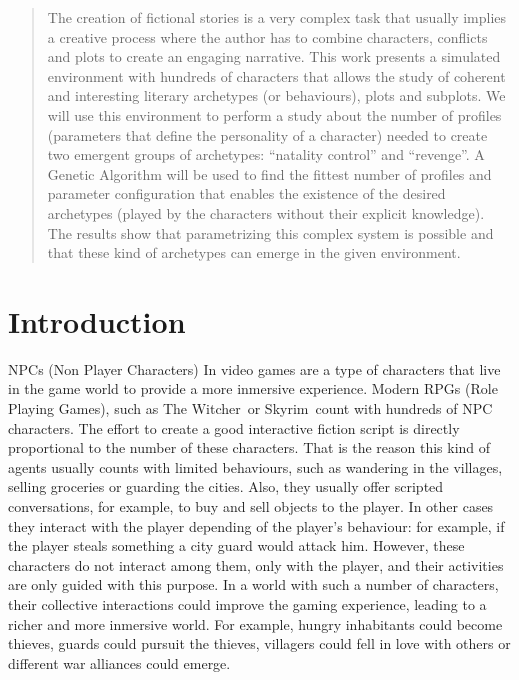 \documentclass[runningheads]{llncs}
\begin{document}
\begin{abstract}


The creation of fictional stories is a very complex task that usually
implies a creative process where the author has to combine characters,
conflicts and plots to create an engaging narrative. This work
presents a simulated environment with hundreds of characters that
allows the study of coherent and interesting literary archetypes (or
behaviours), plots and subplots. We will use this environment to
perform a study about the number of profiles (parameters that define
the personality of a character) needed to create two emergent groups
of archetypes: ``natality control'' and ``revenge''. A Genetic Algorithm
will be used to find the fittest number of profiles and parameter
configuration that enables the existence of the desired archetypes
(played by the characters without their explicit knowledge). The
results show that parametrizing this complex system is possible and
that these kind of archetypes can emerge in the given environment. 

\end{abstract}




\section{Introduction}
\noindent 

NPCs (Non Player Characters) In video games are a type of characters that live in the game world to provide a more inmersive experience. Modern RPGs (Role Playing Games), such as The Witcher~\texttrademark or Skyrim~\texttrademark count with hundreds of NPC characters. The effort to create a good interactive fiction script is directly proportional to the number of these characters. That is the reason this kind of agents usually counts with limited behaviours, such as wandering in the villages, selling groceries or guarding the cities. Also, they usually offer scripted conversations, for example, to buy and sell objects to the player. In other cases they interact with the player depending of the player's behaviour: for example, if the player steals something a city guard would attack him.  However, these characters do not interact among them, only with the player, and their activities are only guided with this purpose. In a world with such a number of characters, their collective interactions could improve the gaming experience, leading to a richer and more inmersive world. For example, hungry inhabitants could become thieves, guards could pursuit the thieves, villagers could fell in love with others or different war alliances could emerge.
\end{document}
